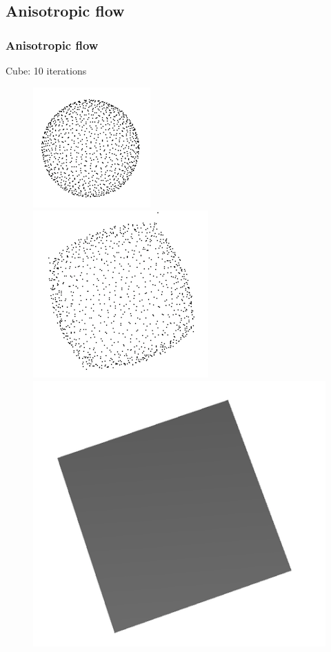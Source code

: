\documentclass{beamer}
\begin{document}
\subsection{Anisotropic flow}
\begin{frame}
    \frametitle{Anisotropic flow}

    Cube: 10 iterations
    \begin{figure}
        \centering
        \includegraphics[scale=0.4]{img/sphere-cube-0}
        \includegraphics[scale=0.3]{img/sphere-cube-10}
        \includegraphics[scale=0.2]{img/sphere-cube-cube}
    \end{figure}


\end{frame}
\end{document}
